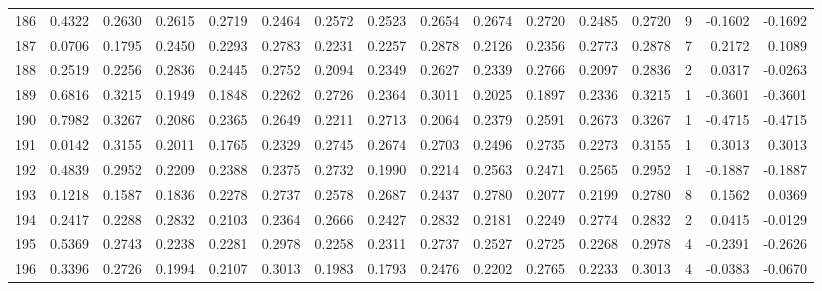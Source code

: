 \begin{tabular}{lrrrrrrrrrrrrrrr}
186 &      0.4322 &  0.2630 &  0.2615 &  0.2719 &  0.2464 &  0.2572 &  0.2523 &  0.2654 &  0.2674 &  0.2720 &   0.2485 &     0.2720 &      9 &                   -0.1602 &                    -0.1692 \\
187 &      0.0706 &  0.1795 &  0.2450 &  0.2293 &  0.2783 &  0.2231 &  0.2257 &  0.2878 &  0.2126 &  0.2356 &   0.2773 &     0.2878 &      7 &                    0.2172 &                     0.1089 \\
188 &      0.2519 &  0.2256 &  0.2836 &  0.2445 &  0.2752 &  0.2094 &  0.2349 &  0.2627 &  0.2339 &  0.2766 &   0.2097 &     0.2836 &      2 &                    0.0317 &                    -0.0263 \\
189 &      0.6816 &  0.3215 &  0.1949 &  0.1848 &  0.2262 &  0.2726 &  0.2364 &  0.3011 &  0.2025 &  0.1897 &   0.2336 &     0.3215 &      1 &                   -0.3601 &                    -0.3601 \\
190 &      0.7982 &  0.3267 &  0.2086 &  0.2365 &  0.2649 &  0.2211 &  0.2713 &  0.2064 &  0.2379 &  0.2591 &   0.2673 &     0.3267 &      1 &                   -0.4715 &                    -0.4715 \\
191 &      0.0142 &  0.3155 &  0.2011 &  0.1765 &  0.2329 &  0.2745 &  0.2674 &  0.2703 &  0.2496 &  0.2735 &   0.2273 &     0.3155 &      1 &                    0.3013 &                     0.3013 \\
192 &      0.4839 &  0.2952 &  0.2209 &  0.2388 &  0.2375 &  0.2732 &  0.1990 &  0.2214 &  0.2563 &  0.2471 &   0.2565 &     0.2952 &      1 &                   -0.1887 &                    -0.1887 \\
193 &      0.1218 &  0.1587 &  0.1836 &  0.2278 &  0.2737 &  0.2578 &  0.2687 &  0.2437 &  0.2780 &  0.2077 &   0.2199 &     0.2780 &      8 &                    0.1562 &                     0.0369 \\
194 &      0.2417 &  0.2288 &  0.2832 &  0.2103 &  0.2364 &  0.2666 &  0.2427 &  0.2832 &  0.2181 &  0.2249 &   0.2774 &     0.2832 &      2 &                    0.0415 &                    -0.0129 \\
195 &      0.5369 &  0.2743 &  0.2238 &  0.2281 &  0.2978 &  0.2258 &  0.2311 &  0.2737 &  0.2527 &  0.2725 &   0.2268 &     0.2978 &      4 &                   -0.2391 &                    -0.2626 \\
196 &      0.3396 &  0.2726 &  0.1994 &  0.2107 &  0.3013 &  0.1983 &  0.1793 &  0.2476 &  0.2202 &  0.2765 &   0.2233 &     0.3013 &      4 &                   -0.0383 &                    -0.0670 \\

\end{tabular}
